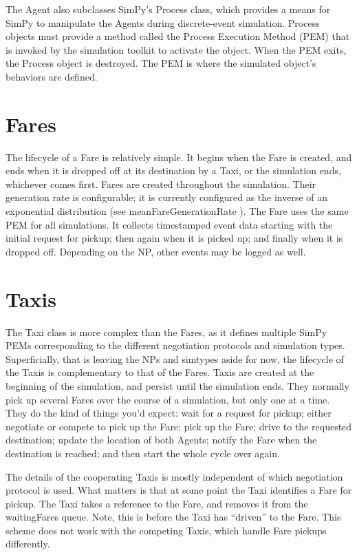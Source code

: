 \documentclass[11pt,letterpaper,onecolumn,twoside,openright,final]{report}
\begin{document}
The Agent also subclasses SimPy's Process class, which provides a means for SimPy to manipulate the Agents during discrete-event simulation.
Process objects must provide a method called the Process Execution Method (PEM) that is invoked by the simulation toolkit to activate the object.
When the PEM exits, the Process object is destroyed.
The PEM is where the simulated object's behaviors are defined.

\section{Fares}
The lifecycle of a Fare is relatively simple.
It begins when the Fare is created, and ends when it is dropped off at its destination by a Taxi, or the simulation ends, whichever comes first.
Fares are created throughout the simulation.
Their generation rate is configurable; it is currently configured as the inverse of an exponential distribution (see meanFareGenerationRate ).
The Fare uses the same PEM for all simulations.
It collects timestamped event data starting with the initial request for pickup; then again when it is picked up; and finally when it is dropped off.
Depending on the NP, other events may be logged as well.

\section{Taxis}
The Taxi class is more complex than the Fares, as it defines multiple SimPy PEMs corresponding to the different negotiation protocols and simulation types.
Superficially, that is leaving the NPs and simtypes aside for now, the lifecycle of the Taxis is complementary to that of the Fares.
Taxis are created at the beginning of the simulation, and persist until the simulation ends.
They normally pick up several Fares over the course of a simulation, but only one at a time.
They do the kind of things you'd expect: wait for a request for pickup; either negotiate or compete to pick up the Fare; pick up the Fare; drive to the requested destination; update the location of both Agents; notify the Fare when the destination is reached; and then start the whole cycle over again.

The details of the cooperating Taxis is mostly independent of which negotiation protocol is used.
What matters is that at some point the Taxi identifies a Fare for pickup.
The Taxi takes a reference to the Fare, and removes it from the waitingFares queue.
Note, this is before the Taxi has ``driven'' to the Fare.
This scheme does not work with the competing Taxis, which handle Fare pickups differently.
\end{document}

